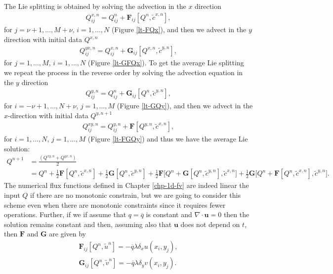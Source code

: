 The Lie splitting is obtained by solving the advection in the $x$ direction
\begin{align*}
	{Q}^{x,n}_{ij} =  {Q}^{n}_{ij} + \mathbf{F}_{ij}[{Q^n}, \tilde{c}^{x,n}],
\end{align*}
for $j=\nu+1, \ldots, M+\nu$, $i=1, \ldots, N$ (Figure \ref{lt-FQx}), and then we advect in the $y$ direction with initial data ${Q}^{x,n}$ 
\begin{align*}
	{Q}^{yx,n}_{ij} = Q^{x,n}_{ij} + \mathbf{G}_{ij}[{Q}^{x,n},\tilde{c}^{y,n}],
\end{align*}
for $j=1, \ldots, M$,  $i=1, \ldots, N$  (Figure \ref{lt-GFQx}).
To get the average Lie splitting we repeat the process in the reverse order by solving the advection equation
in the $y$ direction
\begin{align*}
	{Q}^{y,n}_{ij} =  {Q}^{n}_{ij} + \mathbf{G}_{ij}[{Q^n},\tilde{c}^{y,n}],
\end{align*}
for $i=-\nu+1, \ldots, N+\nu$, $j=1, \ldots, M$ (Figure \ref{lt-GQy}), and then we advect in the $x$-direction with initial data ${Q}^{y,n+1}$ 
\begin{align*}
	{Q}^{xy,n}_{ij} = Q^{y,n}_{ij} + \mathbf{F}[Q^{y,n},\tilde{c}^{x,n}],
\end{align*}
for $i=1, \ldots, N$, $j=1, \ldots, M$ (Figure \ref{lt-FGQy}) and thus we have the average Lie solution:
\begin{align*}
	Q^{n+1} &= \frac{(Q^{xy,n} + Q^{yx,n})}{2} \\
    &= Q^n + \frac{1}{2}\mathbf{F}[Q^n,\tilde{c}^{x,n}] + \frac{1}{2}\mathbf{G}[Q^n,\tilde{c}^{y,n}] + 
    \frac{1}{2}\mathbf{F}\bigg[Q^n + \mathbf{G}[Q^n, \tilde{c}^{y,n}], \tilde{c}^{x,n}\bigg]+
    \frac{1}{2}\mathbf{G}\bigg[Q^n + \mathbf{F}[Q^n, \tilde{c}^{x,n}], \tilde{c}^{y,n}\bigg].
\end{align*}
The numerical flux functions defined in Chapter \ref{chp-1d-fv} are indeed linear the 
input $Q$ if there are no monotonic constrain, but we are going to consider this scheme
even when there are monotonic constraints since it requires fewer operations.
Further, if we if assume that $q = \overline{q}$ is constant and $\nabla \cdot 
\boldsymbol{u} = 0$ then the solution remains constant and then, assuming also that
$\boldsymbol{u}$ does not depend on $t$, then $\mathbf{F}$ and $\mathbf{G}$ are given by
\begin{align*}
	\mathbf{F}_{ij}[Q^n,\tilde{u}^n] = -\overline{q} \lambda {\delta_x} u(x_i,y_j),\\
	\mathbf{G}_{ij}[Q^n,\tilde{v}^n] = -\overline{q} \lambda {\delta_y} v(x_i,y_j).
\end{align*}
